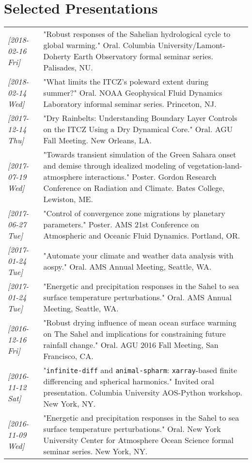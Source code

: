 \documentclass[12pt,letterpaper]{shillcv}
\begin{document}
\section*{Selected Presentations}
\label{sec:org17a9b3c}
\begin{center}
\begin{tabularx}{\textwidth}{lX}
\textit{[2018-02-16 Fri]} & "Robust responses of the Sahelian hydrological cycle to global warming."  Oral.  Columbia University/Lamont-Doherty Earth Observatory formal seminar series.  Palisades, NU.\\
\textit{[2018-02-14 Wed]} & "What limits the ITCZ's poleward extent during summer?"  Oral.  NOAA Geophysical Fluid Dynamics Laboratory informal seminar series.  Princeton, NJ.\\
\textit{[2017-12-14 Thu]} & "Dry Rainbelts: Understanding Boundary Layer Controls on the ITCZ Using a Dry Dynamical Core."  Oral.  AGU Fall Meeting.  New Orleans, LA.\\
\textit{[2017-07-19 Wed]} & "Towards transient simulation of the Green Sahara onset and demise through idealized modeling of vegetation-land-atmosphere interactions."  Poster.  Gordon Research Conference on Radiation and Climate.  Bates College, Lewiston, ME.\\
\textit{[2017-06-27 Tue]} & "Control of convergence zone migrations by planetary parameters."  Poster.  AMS 21st Conference on Atmospheric and Oceanic Fluid Dynamics.  Portland, OR.\\
\textit{[2017-01-24 Tue]} & "Automate your climate and weather data analysis with aospy."  Oral.  AMS Annual Meeting, Seattle, WA.\\
\textit{[2017-01-24 Tue]} & "Energetic and precipitation responses in the Sahel to sea surface temperature perturbations."  Oral.  AMS Annual Meeting, Seattle, WA.\\
\textit{[2016-12-16 Fri]} & "Robust drying influence of mean ocean surface warming on The Sahel and implications for constraining future rainfall change."  Oral.  AGU 2016 Fall Meeting, San Francisco, CA.\\
\textit{[2016-11-12 Sat]} & "\texttt{infinite-diff} and \texttt{animal-spharm}: \texttt{xarray}-based finite differencing and spherical harmonics."  Invited oral presentation.  Columbia University AOS-Python workshop.  New York, NY.\\
\textit{[2016-11-09 Wed]} & "Energetic and precipitation responses in the Sahel to sea surface temperature perturbations."  Oral.  New York University Center for Atmosphere Ocean Science formal seminar series.  New York, NY.\\

\end{tabularx}
\end{center}
\end{document}
